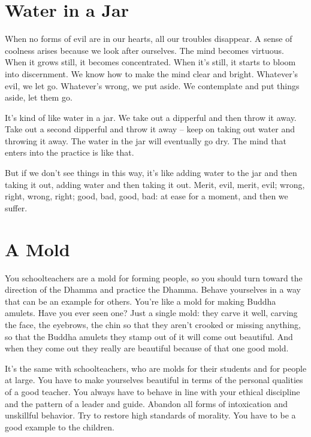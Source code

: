 \clearpage

\section{Water in a Jar}

When no forms of evil are in our hearts, all our troubles disappear. A sense of coolness arises because we look after ourselves. The mind becomes virtuous. When it grows still, it becomes concentrated. When it's still, it starts to bloom into discernment. We know how to make the mind clear and bright. Whatever's evil, we let go. Whatever's wrong, we put aside. We contemplate and put things aside, let them go.

It's kind of like water in a jar. We take out a dipperful and then throw it away. Take out a second dipperful and throw it away -- keep on taking out water and throwing it away. The water in the jar will eventually go dry. The mind that enters into the practice is like that.

But if we don't see things in this way, it's like adding water to the jar and then taking it out, adding water and then taking it out. Merit, evil, merit, evil; wrong, right, wrong, right; good, bad, good, bad: at ease for a moment, and then we suffer. 

\clearpage

\section{A Mold}

You schoolteachers are a mold for forming people, so you should turn toward the direction of the Dhamma and practice the Dhamma. Behave yourselves in a way that can be an example for others. You're like a mold for making Buddha amulets. Have you ever seen one? Just a single mold: they carve it well, carving the face, the eyebrows, the chin so that they aren't crooked or missing anything, so that the Buddha amulets they stamp out of it will come out beautiful. And when they come out they really are beautiful because of that one good mold.

It's the same with schoolteachers, who are molds for their students and for people at large. You have to make yourselves beautiful in terms of the personal qualities of a good teacher. You always have to behave in line with your ethical discipline and the pattern of a leader and guide. Abandon all forms of intoxication and unskillful behavior. Try to restore high standards of morality. You have to be a good example to the children.

